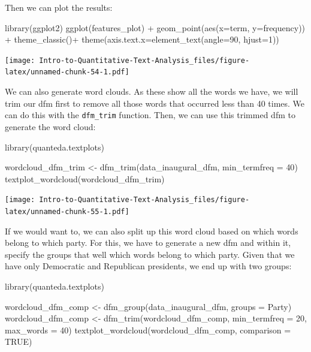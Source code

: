 \documentclass[
]{article}
\newenvironment{Shaded}{\begin{snugshade}}{\end{snugshade}}
\newcommand{\AttributeTok}[1]{\textcolor[rgb]{0.77,0.63,0.00}{#1}}
\newcommand{\ConstantTok}[1]{\textcolor[rgb]{0.00,0.00,0.00}{#1}}
\newcommand{\DecValTok}[1]{\textcolor[rgb]{0.00,0.00,0.81}{#1}}
\newcommand{\FunctionTok}[1]{\textcolor[rgb]{0.00,0.00,0.00}{#1}}
\newcommand{\NormalTok}[1]{#1}
\newcommand{\OtherTok}[1]{\textcolor[rgb]{0.56,0.35,0.01}{#1}}
\newcommand{\SpecialCharTok}[1]{\textcolor[rgb]{0.00,0.00,0.00}{#1}}
\begin{document}
Then we can plot the results:

\begin{Shaded}
\begin{Highlighting}[]
\FunctionTok{library}\NormalTok{(ggplot2)}
\FunctionTok{ggplot}\NormalTok{(features\_plot) }\SpecialCharTok{+} 
 \FunctionTok{geom\_point}\NormalTok{(}\FunctionTok{aes}\NormalTok{(}\AttributeTok{x=}\NormalTok{term, }\AttributeTok{y=}\NormalTok{frequency)) }\SpecialCharTok{+}
 \FunctionTok{theme\_classic}\NormalTok{()}\SpecialCharTok{+}
 \FunctionTok{theme}\NormalTok{(}\AttributeTok{axis.text.x=}\FunctionTok{element\_text}\NormalTok{(}\AttributeTok{angle=}\DecValTok{90}\NormalTok{, }\AttributeTok{hjust=}\DecValTok{1}\NormalTok{))}
\end{Highlighting}
\end{Shaded}

\texttt{[image: Intro-to-Quantitative-Text-Analysis\_files/figure-latex/unnamed-chunk-54-1.pdf]}

We can also generate word clouds. As these show all the words we have, we will trim our dfm first to remove all those words that occurred less than 40 times. We can do this with the \texttt{dfm\_trim} function. Then, we can use this trimmed dfm to generate the word cloud:

\begin{Shaded}
\begin{Highlighting}[]
\FunctionTok{library}\NormalTok{(quanteda.textplots)}

\NormalTok{wordcloud\_dfm\_trim }\OtherTok{\textless{}{-}} \FunctionTok{dfm\_trim}\NormalTok{(data\_inaugural\_dfm, }\AttributeTok{min\_termfreq =} \DecValTok{40}\NormalTok{)}
\FunctionTok{textplot\_wordcloud}\NormalTok{(wordcloud\_dfm\_trim)}
\end{Highlighting}
\end{Shaded}

\texttt{[image: Intro-to-Quantitative-Text-Analysis\_files/figure-latex/unnamed-chunk-55-1.pdf]}

If we would want to, we can also split up this word cloud based on which words belong to which party. For this, we have to generate a new dfm and within it, specify the groups that well which words belong to which party. Given that we have only Democratic and Republican presidents, we end up with two groups:

\begin{Shaded}
\begin{Highlighting}[]
\FunctionTok{library}\NormalTok{(quanteda.textplots)}

\NormalTok{wordcloud\_dfm\_comp }\OtherTok{\textless{}{-}} \FunctionTok{dfm\_group}\NormalTok{(data\_inaugural\_dfm, }\AttributeTok{groups =}\NormalTok{ Party)}
\NormalTok{wordcloud\_dfm\_comp }\OtherTok{\textless{}{-}} \FunctionTok{dfm\_trim}\NormalTok{(wordcloud\_dfm\_comp, }\AttributeTok{min\_termfreq =} \DecValTok{20}\NormalTok{,}
    \AttributeTok{max\_words =} \DecValTok{40}\NormalTok{)}
\FunctionTok{textplot\_wordcloud}\NormalTok{(wordcloud\_dfm\_comp, }\AttributeTok{comparison =} \ConstantTok{TRUE}\NormalTok{)}
\end{Highlighting}
\end{Shaded}
\end{document}
